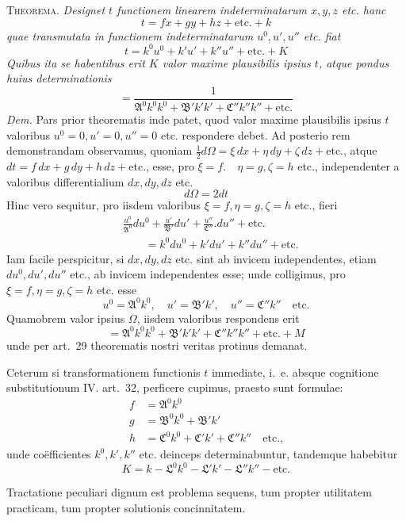 \textsc{Theorema.} \textit{Designet \(t\) functionem linearem indeterminatarum \(x,y,z\) etc. hanc}
\[
t=fx+gy+hz+\text{etc.}+k
\]
\textit{quae transmutata in functionem indeterminatarum \(u^0,u',u''\) etc. fiat}
\[
t=k^0u^0+k'u'+k''u''+\text{etc.}+K
\]
\textit{Quibus ita se habentibus erit \(K\) valor maxime plausibilis ipsius \(t\), atque pondus huius determinationis}
\[
=\frac1{\mathfrak{A}^0k^0k^0+\mathfrak{B}'k'k'+\mathfrak{C}''k''k''+\text{etc.}}
\]
\textit{Dem.} Pars prior theorematis inde patet, quod valor maxime plausibilis ipsius \(t\) valoribus \(u^0=0,\allowbreak u'=0,\allowbreak u''=0\) etc. respondere debet. Ad posterio%
rem demonstrandam observamus, quoniam \(\tfrac12d\Omega=\xi\,dx+\eta\,dy+\zeta\,dz+\text{etc.}\), atque \(dt=f\,dx+g\,dy+h\,dz+\text{etc.}\), esse, pro \(\xi=f.\quad\eta=g,\allowbreak\zeta=h\) etc., independenter a valoribus differentialium \(dx,dy,dz\) etc.
\[
d\Omega=2dt
\]
Hinc vero sequitur, pro iisdem valoribus \(\xi=f,\allowbreak\eta=g,\allowbreak\zeta=h\) etc., fieri
\[
\begin{aligned}
&\frac{u^0}{\mathfrak{A}^0}du^0+\frac{u'}{\mathfrak{B}'}du'+\frac{u''}{\mathfrak{C}''}.du''+\text{etc.}\\
&\qquad=k^0du^0+k'du'+k''du''+\text{etc.}
\end{aligned}
\]
Iam facile perspicitur, si \(dx,dy,dz\) etc. sint ab invicem independentes, etiam \(du^0,du',du''\) etc., ab invicem independentes esse; unde colligimus, pro \(\xi=f,\allowbreak\eta=g,\allowbreak\zeta=h\) etc. esse
\[
u^0=\mathfrak{A}^0k^0,\quad u'=\mathfrak{B}'k',\quad u''=\mathfrak{C}''k''\quad\text{etc.}
\]
Quamobrem valor ipsius \(\Omega\), iisdem valoribus respondens erit
\[
=\mathfrak{A}^0k^0k^0+\mathfrak{B}'k'k'+\mathfrak{C}''k''k''+\text{etc.}+M
\]
unde per art.\ 29 theorematis nostri veritas protinus demanat.

Ceterum si transformationem functionis \(t\) immediate, i.\ e. absque cognitione substitutionum IV. art.\ 32, perficere cupimus, praesto sunt formulae:
\[
\begin{aligned}
f&=\mathfrak{A}^0k^0\\
g&=\mathfrak{B}^0k^0+\mathfrak{B}'k'\\
h&=\mathfrak{C}^0k^0+\mathfrak{C}'k'+\mathfrak{C}''k''\quad\text{etc.,}
\end{aligned}
\]
unde coëfficientes \(k^0,k',k''\) etc. deinceps determinabuntur, tandemque habebitur
\[
K=k-\mathfrak{L}^0k^0-\mathfrak{L}'k'-\mathfrak{L}''k''-\text{etc.}
\]

Tractatione peculiari dignum est problema sequens, tum propter utilitatem practicam, tum propter solutionis concinnitatem.

